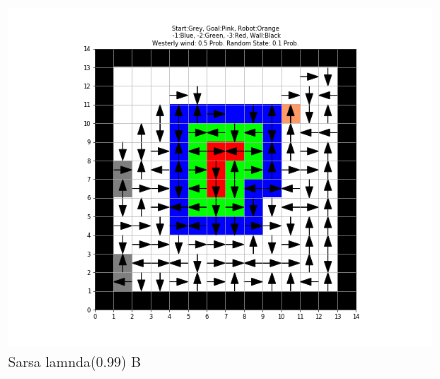 \documentclass[12pt, letterpaper, twoside]{report}
\begin{document}
  \begin{figure}[b]
    \includegraphics[width=\linewidth]{Sarsa__Problem_B_lambda_099.png}
    \caption{Sarsa lamnda(0.99) B}
  \end{figure}
  \label{fig:Softamx}
\end{document}
